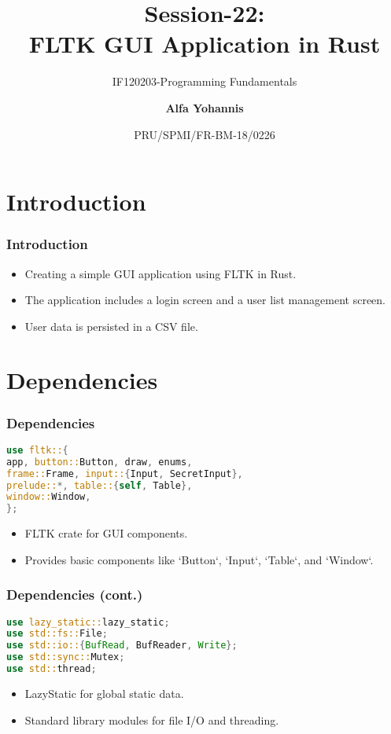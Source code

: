 \documentclass[aspectratio=169, table]{beamer}
\subtitle{IF120203-Programming Fundamentals}
\title{Session-22:\\\LARGE{FLTK GUI Application in Rust}\\ \vspace{10pt}}
\date[Serial]{\scriptsize {PRU/SPMI/FR-BM-18/0226}}
\author[Pradita]{\small{\textbf{Alfa Yohannis}}}
\begin{document}
\frame{\titlepage}

\begin{frame}
\tableofcontents
\end{frame}

\section{Introduction}
\begin{frame}
\frametitle{Introduction}
\begin{itemize}
\item Creating a simple GUI application using FLTK in Rust.
\item The application includes a login screen and a user list management screen.
\item User data is persisted in a CSV file.
\end{itemize}
\end{frame}

\section{Dependencies}
\begin{frame}[fragile]
\frametitle{Dependencies}
\begin{lstlisting}[language=Rust]
use fltk::{
app, button::Button, draw, enums,
frame::Frame, input::{Input, SecretInput},
prelude::*, table::{self, Table},
window::Window,
};
\end{lstlisting}
\begin{itemize}
\item FLTK crate for GUI components.
\item Provides basic components like `Button`, `Input`, `Table`, and `Window`.
\end{itemize}
\end{frame}

\begin{frame}[fragile]
\frametitle{Dependencies (cont.)}
\begin{lstlisting}[language=Rust]
use lazy_static::lazy_static;
use std::fs::File;
use std::io::{BufRead, BufReader, Write};
use std::sync::Mutex;
use std::thread;
\end{lstlisting}
\begin{itemize}
\item LazyStatic for global static data.
\item Standard library modules for file I/O and threading.
\end{itemize}
\end{frame}
\end{document}
